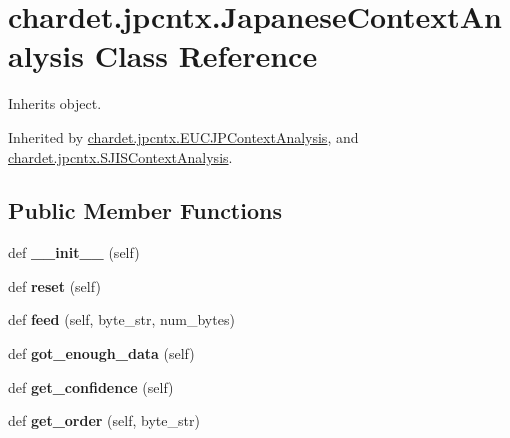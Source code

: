 \hypertarget{classchardet_1_1jpcntx_1_1_japanese_context_analysis}{}\section{chardet.\+jpcntx.\+Japanese\+Context\+Analysis Class Reference}
\label{classchardet_1_1jpcntx_1_1_japanese_context_analysis}


Inherits object.



Inherited by \hyperlink{classchardet_1_1jpcntx_1_1_e_u_c_j_p_context_analysis}{chardet.\+jpcntx.\+E\+U\+C\+J\+P\+Context\+Analysis}, and \hyperlink{classchardet_1_1jpcntx_1_1_s_j_i_s_context_analysis}{chardet.\+jpcntx.\+S\+J\+I\+S\+Context\+Analysis}.

\subsection*{Public Member Functions}
\begin{DoxyCompactItemize}
\item 
\mbox{\label{classchardet_1_1jpcntx_1_1_japanese_context_analysis_aca17cea98143b2cce9bcc40442918056}} 
def {\bfseries \+\_\+\+\_\+init\+\_\+\+\_\+} (self)
\item 
\mbox{\label{classchardet_1_1jpcntx_1_1_japanese_context_analysis_a7712e065983164b4caf4bb66da51ac8d}} 
def {\bfseries reset} (self)
\item 
\mbox{\label{classchardet_1_1jpcntx_1_1_japanese_context_analysis_aa97d713eee5a0bca3ca4d7196a450f1e}} 
def {\bfseries feed} (self, byte\+\_\+str, num\+\_\+bytes)
\item 
\mbox{\label{classchardet_1_1jpcntx_1_1_japanese_context_analysis_a8b69be05426db47380efd6094eb782e2}} 
def {\bfseries got\+\_\+enough\+\_\+data} (self)
\item 
\mbox{\label{classchardet_1_1jpcntx_1_1_japanese_context_analysis_a510ce24c4dcfb5330c390cc8f79af12a}} 
def {\bfseries get\+\_\+confidence} (self)
\item 
\mbox{\label{classchardet_1_1jpcntx_1_1_japanese_context_analysis_adfc5a1d058972d1d097b7d3dd47dd779}} 
def {\bfseries get\+\_\+order} (self, byte\+\_\+str)
\end{DoxyCompactItemize}
